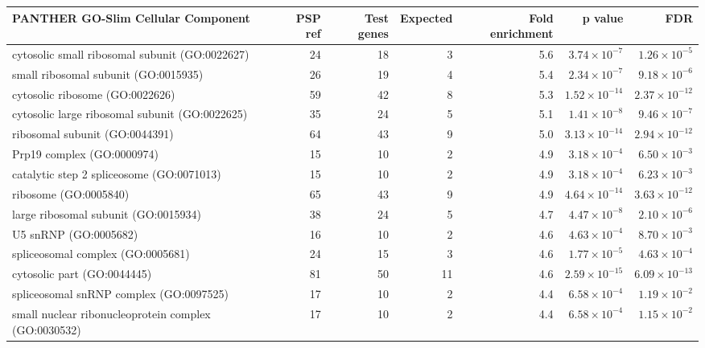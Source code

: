 \begin{table}[ht]
\centering
\begin{adjustbox}{width=\textwidth}
\begin{tabular}{lrrrrrr}
  \hline
PANTHER GO-Slim Cellular Component & PSP ref & Test genes & Expected & Fold enrichment & p value & FDR \\ 
  \hline
cytosolic small ribosomal subunit (GO:0022627) & 24 & 18 & 3 & 5.6 & $3.74 \times 10^{-7}$ & $1.26 \times 10^{-5}$ \\ 
  small ribosomal subunit (GO:0015935) & 26 & 19 & 4 & 5.4 & $2.34 \times 10^{-7}$ & $9.18 \times 10^{-6}$ \\ 
  cytosolic ribosome (GO:0022626) & 59 & 42 & 8 & 5.3 & $1.52 \times 10^{-14}$ & $2.37 \times 10^{-12}$ \\ 
  cytosolic large ribosomal subunit (GO:0022625) & 35 & 24 & 5 & 5.1 & $1.41 \times 10^{-8}$ & $9.46 \times 10^{-7}$ \\ 
  ribosomal subunit (GO:0044391) & 64 & 43 & 9 & 5.0 & $3.13 \times 10^{-14}$ & $2.94 \times 10^{-12}$ \\ 
  Prp19 complex (GO:0000974) & 15 & 10 & 2 & 4.9 & $3.18 \times 10^{-4}$ & $6.50 \times 10^{-3}$ \\ 
  catalytic step 2 spliceosome (GO:0071013) & 15 & 10 & 2 & 4.9 & $3.18 \times 10^{-4}$ & $6.23 \times 10^{-3}$ \\ 
  ribosome (GO:0005840) & 65 & 43 & 9 & 4.9 & $4.64 \times 10^{-14}$ & $3.63 \times 10^{-12}$ \\ 
  large ribosomal subunit (GO:0015934) & 38 & 24 & 5 & 4.7 & $4.47 \times 10^{-8}$ & $2.10 \times 10^{-6}$ \\ 
  U5 snRNP (GO:0005682) & 16 & 10 & 2 & 4.6 & $4.63 \times 10^{-4}$ & $8.70 \times 10^{-3}$ \\ 
  spliceosomal complex (GO:0005681) & 24 & 15 & 3 & 4.6 & $1.77 \times 10^{-5}$ & $4.63 \times 10^{-4}$ \\ 
  cytosolic part (GO:0044445) & 81 & 50 & 11 & 4.6 & $2.59 \times 10^{-15}$ & $6.09 \times 10^{-13}$ \\ 
  spliceosomal snRNP complex (GO:0097525) & 17 & 10 & 2 & 4.4 & $6.58 \times 10^{-4}$ & $1.19 \times 10^{-2}$ \\ 
  small nuclear ribonucleoprotein complex (GO:0030532) & 17 & 10 & 2 & 4.4 & $6.58 \times 10^{-4}$ & $1.15 \times 10^{-2}$ \\ 

\end{tabular}
\end{adjustbox}
\end{table}
